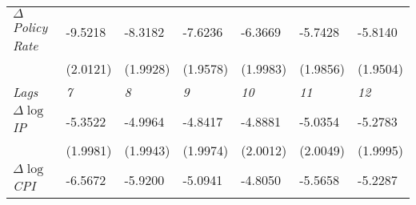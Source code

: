 \begin{table}[!htpb]
\begin{adjustbox}{max width=\textwidth}
\begin{tabular}{@{}lllllll@{}}
$\Delta$\textit{Policy Rate}            & \cellcolor[HTML]{9AFF99}-9.5218                         & \cellcolor[HTML]{9AFF99} -8.3182                          & \cellcolor[HTML]{9AFF99}-7.6236                         & \cellcolor[HTML]{9AFF99}-6.3669                         & \cellcolor[HTML]{9AFF99}-5.7428                         & \cellcolor[HTML]{9AFF99}-5.8140                         \\
                               & \cellcolor[HTML]{9AFF99}(2.0121)                        & \cellcolor[HTML]{9AFF99}(1.9928)                        & \cellcolor[HTML]{9AFF99}(1.9578)                        & \cellcolor[HTML]{9AFF99}(1.9983)                        & \cellcolor[HTML]{9AFF99}(1.9856)                        & \cellcolor[HTML]{9AFF99}(1.9504)                        \\ \cmidrule(l){2-7} 
\textit{Lags}                  & \textit{7}                                              & \textit{8}                                              & \textit{9}                                              & \textit{10}                                             & \textit{11}                                             & \textit{12}                                             \\ \cmidrule(l){2-7} 
$\Delta \log$\textit{IP} & \cellcolor[HTML]{9AFF99}-5.3522                         & \cellcolor[HTML]{9AFF99}-4.9964                         & \cellcolor[HTML]{9AFF99}-4.8417                         & \cellcolor[HTML]{9AFF99}-4.8881                         & \cellcolor[HTML]{9AFF99}-5.0354                         & \cellcolor[HTML]{9AFF99}-5.2783                         \\
                               & \cellcolor[HTML]{9AFF99}(1.9981)                        & \cellcolor[HTML]{9AFF99}(1.9943)                        & \cellcolor[HTML]{9AFF99}(1.9974)                        & \cellcolor[HTML]{9AFF99}(2.0012)                        & \cellcolor[HTML]{9AFF99}(2.0049)                        & \cellcolor[HTML]{9AFF99}(1.9995)                        \\ \cmidrule(l){2-7} 
$\Delta \log$\textit{CPI}             & \cellcolor[HTML]{9AFF99}-6.5672                         & \cellcolor[HTML]{9AFF99}-5.9200                         & \cellcolor[HTML]{9AFF99}-5.0941                         & \cellcolor[HTML]{9AFF99}-4.8050                         & \cellcolor[HTML]{9AFF99}-5.5658                         & \cellcolor[HTML]{9AFF99}-5.2287                         \\

\end{tabular}
\end{adjustbox}
\end{table}
